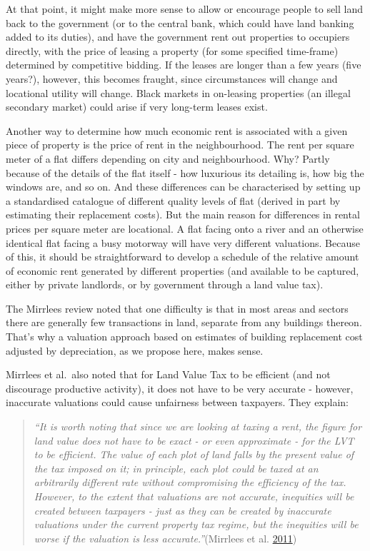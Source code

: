 \documentclass[]{tufte-handout}
\begin{document}
At that point, it might make more sense to allow or encourage people to
sell land back to the government (or to the central bank, which could
have land banking added to its duties), and have the government rent out
properties to occupiers directly, with the price of leasing a property
(for some specified time-frame) determined by competitive bidding. If
the leases are longer than a few years (five years?), however, this
becomes fraught, since circumstances will change and locational utility
will change. Black markets in on-leasing properties (an illegal
secondary market) could arise if very long-term leases exist.

Another way to determine how much economic rent is associated with a
given piece of property is the price of rent in the neighbourhood. The
rent per square meter of a flat differs depending on city and
neighbourhood. Why? Partly because of the details of the flat itself -
how luxurious its detailing is, how big the windows are, and so on. And
these differences can be characterised by setting up a standardised
catalogue of different quality levels of flat (derived in part by
estimating their replacement costs). But the main reason for differences
in rental prices per square meter are locational. A flat facing onto a
river and an otherwise identical flat facing a busy motorway will have
very different valuations. Because of this, it should be straightforward
to develop a schedule of the relative amount of economic rent generated
by different properties (and available to be captured, either by private
landlords, or by government through a land value tax).

The Mirrlees review noted that one difficulty is that in most areas and
sectors there are generally few transactions in land, separate from any
buildings thereon. That's why a valuation approach based on estimates of
building replacement cost adjusted by depreciation, as we propose here,
makes sense.

Mirrlees et al.~also noted that for Land Value Tax to be efficient (and
not discourage productive activity), it does not have to be very
accurate - however, inaccurate valuations could cause unfairness between
taxpayers. They explain:

\begin{quote}
\emph{``It is worth noting that since we are looking at taxing a rent,
the figure for land value does not have to be exact - or even
approximate - for the LVT to be efficient. The value of each plot of
land falls by the present value of the tax imposed on it; in principle,
each plot could be taxed at an arbitrarily different rate without
compromising the efficiency of the tax. However, to the extent that
valuations are not accurate, inequities will be created between
taxpayers - just as they can be created by inaccurate valuations under
the current property tax regime, but the inequities will be worse if the
valuation is less accurate.''}(Mirrlees et al.
\protect\hyperlink{ref-Mirrlees2011}{2011})
\end{quote}
\end{document}
